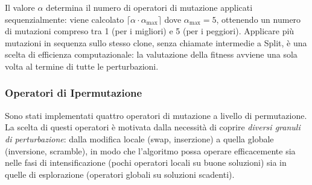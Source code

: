 \documentclass[a4paper,12pt]{article}
\begin{document}
Il valore $\alpha$ determina il numero di operatori di mutazione applicati sequenzialmente: viene calcolato $\lceil \alpha \cdot \alpha_{\max} \rceil$ dove $\alpha_{\max} = 5$, ottenendo un numero di mutazioni compreso tra 1 (per i migliori) e 5 (per i peggiori). Applicare più mutazioni in sequenza sullo stesso clone, senza chiamate intermedie a Split, è una scelta di efficienza computazionale: la valutazione della fitness avviene una sola volta al termine di tutte le perturbazioni.

\subsubsection{Operatori di Ipermutazione}

Sono stati implementati quattro operatori di mutazione a livello di permutazione. La scelta di questi operatori è motivata dalla necessità di coprire \emph{diversi granuli di perturbazione}: dalla modifica locale (swap, inserzione) a quella globale (inversione, scramble), in modo che l'algoritmo possa operare efficacemente sia nelle fasi di intensificazione (pochi operatori locali su buone soluzioni) sia in quelle di esplorazione (operatori globali su soluzioni scadenti).
\end{document}
